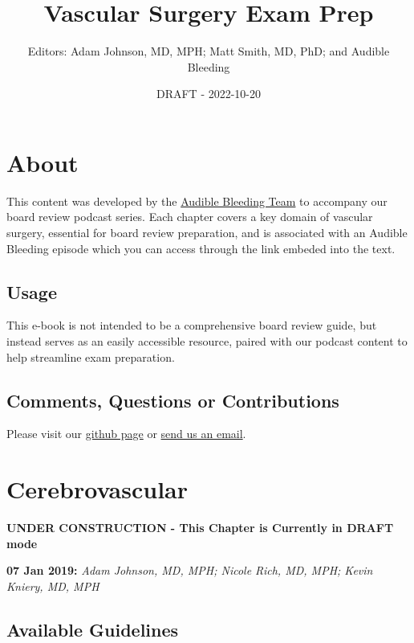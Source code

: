 \documentclass[
]{book}
\title{Vascular Surgery Exam Prep}
\author{Editors: Adam Johnson, MD, MPH; Matt Smith, MD, PhD; and Audible Bleeding}
\date{DRAFT - 2022-10-20}
\begin{document}
\maketitle

{
\setcounter{tocdepth}{1}
\tableofcontents
}
\hypertarget{about}{%
\chapter{About}\label{about}}

This content was developed by the \href{https://www.audiblebleeding.com/about-1/}{Audible Bleeding Team} to accompany our board review podcast series.
Each chapter covers a key domain of vascular surgery, essential for board review preparation, and is associated with an Audible Bleeding episode which you can access through the link embeded into the text.

\hypertarget{usage}{%
\section{Usage}\label{usage}}

This e-book is not intended to be a comprehensive board review guide, but instead serves as an easily accessible resource, paired with our podcast content to help streamline exam preparation.

\hypertarget{comments-questions-or-contributions}{%
\section{Comments, Questions or Contributions}\label{comments-questions-or-contributions}}

Please visit our \href{https://github.com/adam-mdmph/VS-Exam-Prep}{github page} or \href{mailto:audiblebleeding@vascularsociety.org}{send us an email}.

\hypertarget{cerebrovascular}{%
\chapter{Cerebrovascular}\label{cerebrovascular}}

\textbf{UNDER CONSTRUCTION - This Chapter is Currently in DRAFT mode}

\textbf{07 Jan 2019:} \emph{Adam Johnson, MD, MPH; Nicole Rich, MD, MPH; Kevin
Kniery, MD, MPH}

\hypertarget{available-guidelines}{%
\section{Available Guidelines}\label{available-guidelines}}
\end{document}
